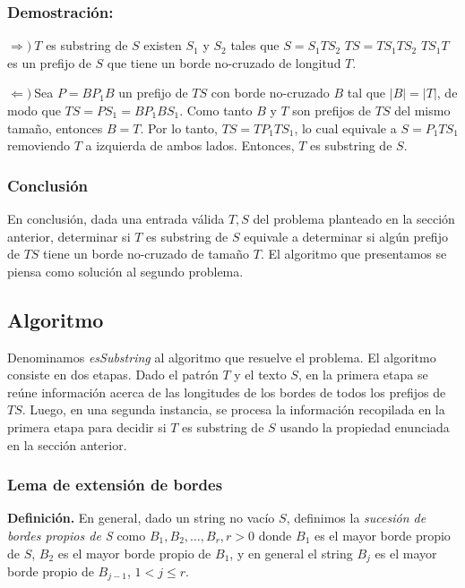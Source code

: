 \subsubsection{Demostración:}

$\Longrightarrow) \ $$T$ es substring de $S$ \spaciousimply existen $S_1$ y $S_2$ tales que $S = S_1 T S_2$ \spaciousimply $TS = T S_1 T S_2$ \spaciousimply $T S_1 T$ es un prefijo de $S$ que tiene un borde no-cruzado de longitud $T$.

$\Longleftarrow) \ $Sea $P = B P_1 B$ un prefijo de $TS$ con borde no-cruzado $B$ tal que $|B| = |T|$, de modo que $TS = P S_1 = B P_1 B S_1$. Como tanto $B$ y $T$ son prefijos de $TS$ del mismo tamaño, entonces $B = T$. Por lo tanto, $TS = T P_1 T S_1$, lo cual equivale a $S = P_1 T S_1$ removiendo $T$ a izquierda de ambos lados. Entonces, $T$ es substring de $S$.

\subsubsection{Conclusión}

En conclusión, dada una entrada válida $T, S$ del problema planteado en la sección anterior, determinar si $T$ es substring de $S$ equivale a determinar si algún prefijo de $TS$ tiene un borde no-cruzado de tamaño $T$. El algoritmo que presentamos se piensa como solución al segundo problema.

\subsection{Algoritmo}

Denominamos \textit{esSubstring} al algoritmo que resuelve el problema. El algoritmo consiste en dos etapas. Dado el patrón $T$ y el texto $S$, en la primera etapa se reúne información acerca de las longitudes de los bordes de todos los prefijos de $TS$. Luego, en una segunda instancia, se procesa la información recopilada en la primera etapa para decidir si $T$ es substring de $S$ usando la propiedad enunciada en la sección anterior.

\subsubsection{Lema de extensión de bordes}

\textbf{Definición.} En general, dado un string no vacío $S$, definimos la \textit{sucesión de bordes propios de S} como $B_1, B_2, \dots, B_r, r > 0$ donde $B_1$ es el mayor borde propio de $S$, $B_2$ es el mayor borde propio de $B_1$, y en general el string $B_j$ es el mayor borde propio de $B_{j-1}$, $1 < j \leq r$.

